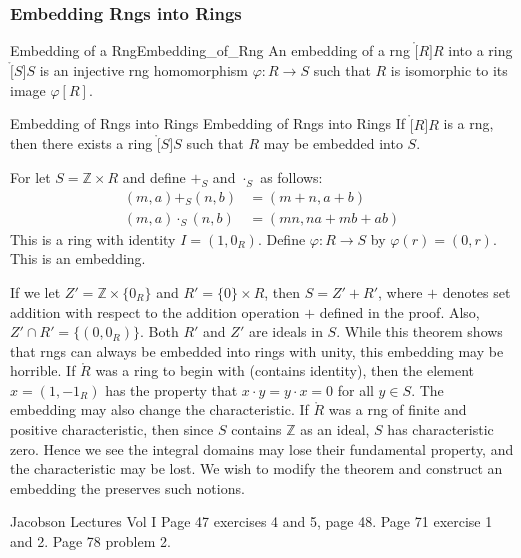 \documentclass{article}                                                        %
\begin{document}
            \subsubsection{Embedding Rngs into Rings}
                \begin{fdefinition}{Embedding of a Rng}{Embedding_of_Rng}
                    An embedding of a rng $\ring[R]{R}$ into a ring
                    $\ring[S]{S}$ is an injective rng homomorphism
                    $\varphi:R\rightarrow{S}$ such that $R$ is isomorphic to its
                    image $\varphi[R]$.
                \end{fdefinition}
                \begin{ftheorem}{Embedding of Rngs into Rings}
                                {Embedding of Rngs into Rings}
                    If $\ring[R]{R}$ is a rng, then there exists a ring
                    $\ring[S]{S}$ such that $R$ may be embedded into $S$.
                \end{ftheorem}
                \begin{bproof}
                    For let $S=\mathbb{Z}\times{R}$ and define $+_{S}$ and
                    $\cdot_{S}$ as follows:
                    \begin{align}
                        (m,a)+_{S}(n,b)&=(m+n,a+b)\\
                        (m,a)\cdot_{S}(n,b)&=(mn,na+mb+ab)
                    \end{align}
                    This is a ring with identity $I=(1,0_{R})$. Define
                    $\varphi:R\rightarrow{S}$ by $\varphi(r)=(0,r)$. This is an
                    embedding.
                \end{bproof}
                If we let $Z'=\mathbb{Z}\times\{0_{R}\}$ and
                $R'=\{0\}\times{R}$, then $S=Z'+R'$, where $+$ denotes set
                addition with respect to the addition operation $+$ defined in
                the proof. Also, $Z'\cap{R}'=\{(0,0_{R})\}$. Both $R'$ and $Z'$
                are ideals in $S$. While this theorem shows that rngs can always
                be embedded into rings with unity, this embedding may be
                horrible. If $\ring{R}$ was a ring to begin with (contains
                identity), then the element $x=(1,\minus{1}_{R})$ has the
                property that $x\cdot{y}=y\cdot{x}=0$ for all $y\in{S}$. The
                embedding may also change the characteristic. If $\ring{R}$ was
                a rng of finite and positive characteristic, then since $S$
                contains $\mathbb{Z}$ as an ideal, $S$ has characteristic zero.
                Hence we see the integral domains may lose their fundamental
                property, and the characteristic may be lost. We wish to modify
                the theorem and construct an embedding the preserves such
                notions.
    \par\hfill\par
    Jacobson Lectures Vol I Page 47 exercises 4 and 5, page 48. Page 71
    exercise 1 and 2. Page 78 problem 2.
\end{document}
